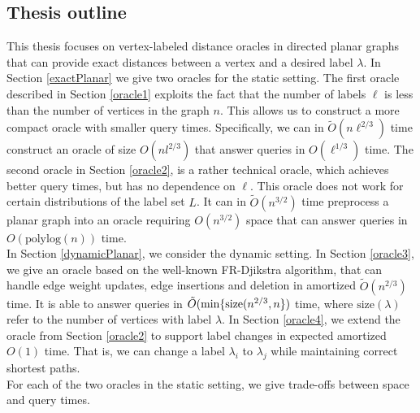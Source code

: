 \subsection{Thesis outline}
This thesis focuses on vertex-labeled distance oracles in directed planar graphs that can provide
exact distances between a vertex and a desired label $\lambda$. In Section \ref{exactPlanar} we
give two oracles for the static setting. The first oracle described in Section \ref{oracle1}
exploits the fact that
the number of labels $\ell$ is less than the number of vertices in the graph $n$. This
allows us to construct a more compact oracle with smaller query times. Specifically, we
can in $\tilde{O}(n\ell^{2/3})$ time construct an oracle of size $O(nl^{2/3})$ that answer queries in
$O(\ell^{1/3})$ time. The second oracle
in Section \ref{oracle2}, is a rather technical oracle, which achieves better query times, but has no dependence
on $\ell$. This oracle does not work for certain distributions of the label set $L$. It can
in $\tilde{O}(n^{3/2})$ time preprocess a planar graph into an oracle requiring $O(n^{3/2})$
space that can answer queries in $O(\text{polylog}(n))$ time. \\
In Section \ref{dynamicPlanar}, we consider the dynamic setting. In Section
\ref{oracle3}, we give an oracle based on the well-known FR-Djikstra algorithm, that can handle edge
weight updates, edge insertions and deletion in amortized $\tilde{O}(n^{2/3})$ time. It
is able to answer queries in $\tilde{O}(\min\{\text{size}(\label)n^{2/3}, n\})$ time, where
  $\text{size}(\lambda)$ refer to the number of vertices with label $\lambda$. In Section
  \ref{oracle4}, we extend the oracle from Section \ref{oracle2} to support label
changes in expected amortized $O(1)$ time. That is, we can change a label $\lambda_i$ to
$\lambda_j$ while maintaining correct shortest paths. \\
For each of the two oracles in the static setting, we give trade-offs between space and
query times.


